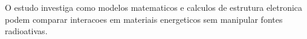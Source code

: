O estudo investiga como modelos matematicos e calculos de estrutura eletronica podem comparar interacoes em materiais energeticos sem manipular fontes radioativas.
